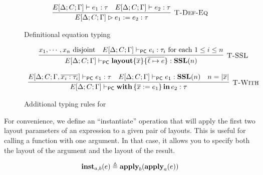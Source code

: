 \begin{figure}
  \[
    \begin{array}{c}
      \labinfer[T-Def-Eq]{E[\Delta;C;\Gamma] \rhd e_1 \defeq e_2 : \tau}
        {E[\Delta;C;\Gamma] \vdash e_1 : \tau
        &E[\Delta;C;\Gamma] \vdash e_2 : \tau}
    \end{array}
  \]
  \caption{Definitional equation typing}
  \label{fig:def-eq}
\end{figure}

\begin{figure}
  \[
    \begin{array}{c}
      \labinfer[T-SSL]{E[\Delta;C;\Gamma] \vdashpc \sslmath{\overline{x}}{\overline{\ell \mapsto e}} : \SSL(n)}
        {x_1,\cdots,x_n \textnormal{ disjoint} & E[\Delta;C;\Gamma] \vdashpc e_i : \tau_i \ensuremath{\textnormal{ for each $1 \le i \le n$}}}
      \\\\
      \labinfer[T-With]{E[\Delta;C;\Gamma] \vdashpc \withIn{\{ \overline{x} := e_1 \}} e_2 : \tau}
        {E[\Delta;C;\Gamma,\overline{x_i : \tau_i}] \vdashpc e_1 : \tau
        &E[\Delta;C;\Gamma] \vdashpc e_1 : \SSL(n)
        &n = |\overline{x}|
        }
    \end{array}
  \]
  \caption{Additional typing rules for \PikaCore}
  \label{fig:pikacore-typing-judgment}
\end{figure}

For convenience, we define an ``instantiate'' operation \instExpr{} that will apply the first two
layout parameters of an expression to a given pair of layouts. This is useful for calling a function
with one argument. In that case, it allows you to specify both the layout of the argument and the
layout of the result.

\[
  \textbf{inst}_{a,b}(e) \triangleq \textbf{apply}_b(\textbf{apply}_a(e))
\]


